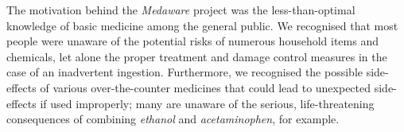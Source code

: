 The motivation behind the \textit{Medaware} project was the less-than-optimal knowledge of basic medicine
among the general public. We recognised that most people were unaware of the potential risks of numerous household
items and chemicals, let alone the proper treatment and damage control measures in the case of an
inadvertent ingestion. Furthermore, we recognised the possible side-effects of various over-the-counter medicines
that could lead to unexpected side-effects if used improperly; many are unaware of the serious, life-threatening
consequences of combining \textit{ethanol} and \textit{acetaminophen}, for example.
